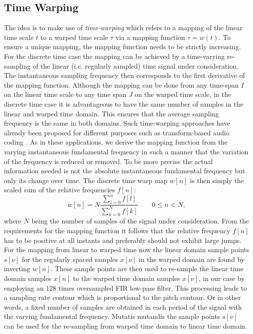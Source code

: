 \subsection{Time Warping}
\label{sub:time_warping}
The idea is to make use of \emph{time-warping} which refers to a mapping of the linear time scale $t$ to a warped time scale $\tau$ via a mapping function $\tau=w(t)$.
To ensure a unique mapping, the mapping function needs to be strictly increasing.
For the discrete time case the mapping can be achieved by a time-varying re-sampling of the linear (i.e. regularly sampled) time signal under consideration.
The instantaneous sampling frequency then corresponds to the first derivative of
the mapping function. Although the mapping can be done from any time-span
$I$ on the linear time scale to any time span $J$ on the warped time scale, in
the discrete time case it is advantageous to have the same number of samples
in the linear and warped time domain. This ensures that the average sampling
frequency is the same in both domains. Such time-warping approaches have already
been proposed for different purposes such as transform-based audio coding
\cite{edler09}. As in these applications, we derive the mapping function from
the varying instantaneous fundamental frequency in such a manner that the variation of the frequency is
reduced or removed. To be more precise the actual information needed is not
the absolute instantaneous fundamental frequency but only its change over time.
The discrete time warp map $w[n]$ is then simply the scaled sum of the relative
frequencies $f[n]$:
\begin{equation}
w[n]=N \frac{\sum^n_{l=0}{f[l]}}{\sum^N_{k=0}{f[k]}}  \qquad 0\leq n<N,
\end{equation}
where $N$ being the number of samples of the signal under consideration.
From the requirements for the mapping function it follows that the relative
frequency $f[n]$ has to be positive at all instants and preferably should not
exhibit large jumps.
For the mapping from linear to warped time now the linear domain sample points
$s[\nu]$ for the regularly spaced samples $x[\nu]$ in the warped domain are
found by inverting $w[n]$. These sample points are then used to re-sample the linear time
domain samples $x[n]$ to the warped time domain samples $x[\nu]$, in our case
by employing an 128 times oversampled FIR low-pass filter. This processing leads to a sampling rate contour which is proportional to the pitch contour. Or in other words, a fixed number of samples are obtained in each period of the signal with the varying fundamental frequency. Mutatis mutandis the sample points $s[\nu]$ can be used for the re-sampling from warped time domain to linear time domain. \\


